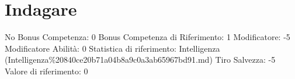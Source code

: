 \section{Indagare}\label{indagare}

\begin{description}
\tightlist
\item[Tags: ABI]
No Bonus Competenza: 0 Bonus Competenza di Riferimento: 1 Modificatore:
-5 Modificatore Abilità: 0 Statistica di riferimento: Intelligenza
(Intelligenza\%20840ce20b71a04b8a9c0a3ab65967bd91.md) Tiro Salvezza: -5
Valore di riferimento: 0
\end{description}
